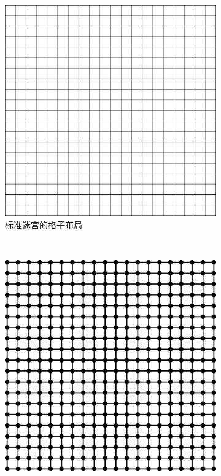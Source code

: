 \documentclass[cs4size,a4paper,adobefonts]{ctexart}
\begin{document}
\begin{figure}[htbp]
  \centering
  \begin{subfigure}[c]{0.31\textwidth}
    \centering
    \includegraphics[width=\textwidth]{rectCells}
    \caption{标准迷宫的格子布局}
  \end{subfigure}
  ~
  \begin{subfigure}[c]{0.31\textwidth}
    \centering
    \includegraphics[width=\textwidth]{rectGraph}

\end{subfigure}
\end{figure}
\end{document}
